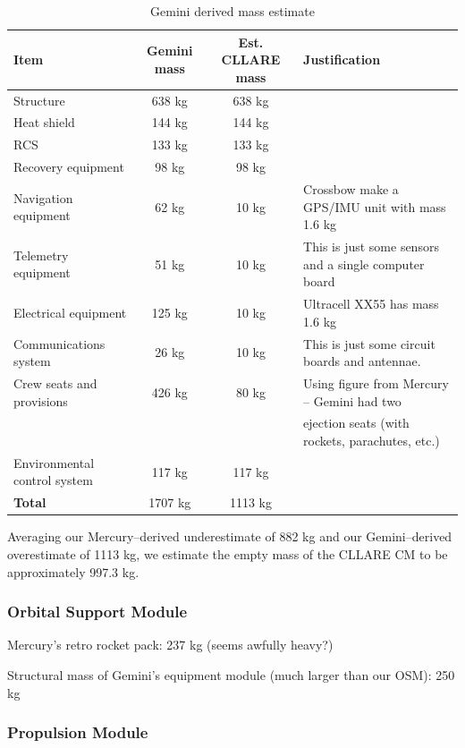 \documentclass{report}
\begin{document}
\begin{table}
\centering
\begin{tabular}{|l|c|c|l|}
\hline
Item	& Gemini mass & Est. CLLARE mass & Justification \\
\hline \hline
Structure		& 638 kg	& 638 kg &  \\
Heat shield		& 144 kg	& 144 kg & \\
RCS			& 133 kg	& 133 kg & \\
Recovery equipment	& 98 kg		& 98 kg & \\
Navigation equipment	& 62 kg		& 10 kg & Crossbow make a GPS/IMU unit with mass 1.6 kg \\
Telemetry equipment	& 51 kg		& 10 kg & This is just some sensors and a single computer board \\
Electrical equipment	& 125 kg	& 10 kg & Ultracell XX55 has mass 1.6 kg \\
Communications system	& 26 kg		& 10 kg & This is just some circuit boards and antennae. \\
Crew seats and provisions & 426 kg	& 80 kg & Using figure from Mercury -- Gemini had two \\
				& 	&	& ejection seats (with rockets, parachutes, etc.) \\
Environmental control system	&  117 kg		& 117 kg & \\
\hline \hline
\textbf{Total}	& 1707 kg & 1113 kg	& \\
\hline
\end{tabular}
\caption{Gemini derived mass estimate}
\label{tab:geminimass}
\end{table} 

Averaging our Mercury--derived underestimate of 882 kg and our Gemini--derived overestimate of 1113 kg, we estimate the empty mass of the CLLARE CM to be approximately 997.3 kg.

\subsubsection{Orbital Support Module}

Mercury's retro rocket pack: 237 kg (seems awfully heavy?)

Structural mass of Gemini's equipment module (much larger than our OSM): 250 kg

\subsubsection{Propulsion Module}
\end{document}
